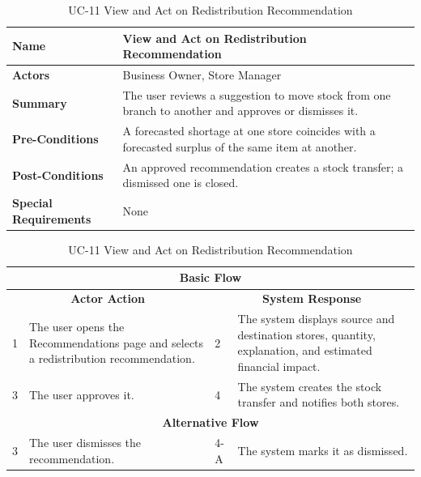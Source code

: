 \documentclass{StockSense}
\begin{document}
\begin{table}[!htbp]
\centering
\vspace*{2\baselineskip}
\caption{UC-11 View and Act on Redistribution Recommendation}
{\normalsize\linespread{1.10}\selectfont
\begin{tabular}{|p{}|p{}|}
\hline
\textbf{Name} & View and Act on Redistribution Recommendation \\ \hline
\textbf{Actors} & Business Owner, Store Manager \\ \hline
\textbf{Summary} & The user reviews a suggestion to move stock from one branch to another and approves or dismisses it. \\ \hline
\textbf{Pre-Conditions} & A forecasted shortage at one store coincides with a forecasted surplus of the same item at another. \\ \hline
\textbf{Post-Conditions} & An approved recommendation creates a stock transfer; a dismissed one is closed. \\ \hline
\textbf{Special Requirements} & None \\ \hline
\end{tabular}\par\nointerlineskip
\begin{tabular}{|p{}|p{}|p{}|p{}|}
\multicolumn{4}{|c|}{\textbf{Basic Flow}} \\ \hline
\multicolumn{2}{|c|}{\textbf{Actor Action}} & \multicolumn{2}{c|}{\textbf{System Response}} \\ \hline
1 & The user opens the Recommendations page and selects a redistribution recommendation. & 2 & The system displays source and destination stores, quantity, explanation, and estimated financial impact. \\ \hline
3 & The user approves it. & 4 & The system creates the stock transfer and notifies both stores. \\ \hline
\multicolumn{4}{|c|}{\textbf{Alternative Flow}} \\ \hline
3 & The user dismisses the recommendation. & 4-A & The system marks it as dismissed. \\ \hline
\end{tabular}\par}
\end{table}
\end{document}
